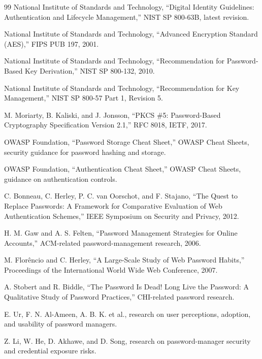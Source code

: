 \documentclass[12pt,a4paper,oneside]{report}
\begin{document}
\clearpage
{}
{}
\renewcommand{\bibname}{References}
\begin{thebibliography}{99}
\small
\setlength{\itemsep}{4pt}
 National Institute of Standards and Technology, “Digital Identity Guidelines: Authentication and Lifecycle Management,” NIST SP 800-63B, latest revision.

 National Institute of Standards and Technology, “Advanced Encryption Standard (AES),” FIPS PUB 197, 2001.

 National Institute of Standards and Technology, “Recommendation for Password-Based Key Derivation,” NIST SP 800-132, 2010.

 National Institute of Standards and Technology, “Recommendation for Key Management,” NIST SP 800-57 Part 1, Revision 5.

 M. Moriarty, B. Kaliski, and J. Jonsson, “PKCS \#5: Password-Based Cryptography Specification Version 2.1,” RFC 8018, IETF, 2017.

 OWASP Foundation, “Password Storage Cheat Sheet,” OWASP Cheat Sheets, security guidance for password hashing and storage.

 OWASP Foundation, “Authentication Cheat Sheet,” OWASP Cheat Sheets, guidance on authentication controls.

 C. Bonneau, C. Herley, P. C. van Oorschot, and F. Stajano, “The Quest to Replace Passwords: A Framework for Comparative Evaluation of Web Authentication Schemes,” IEEE Symposium on Security and Privacy, 2012.

 H. M. Gaw and A. S. Felten, “Password Management Strategies for Online Accounts,” ACM-related password-management research, 2006.

 M. Florêncio and C. Herley, “A Large-Scale Study of Web Password Habits,” Proceedings of the International World Wide Web Conference, 2007.

 A. Stobert and R. Biddle, “The Password Is Dead! Long Live the Password: A Qualitative Study of Password Practices,” CHI-related password research.

 E. Ur, F. N. Al-Ameen, A. B. K. et al., research on user perceptions, adoption, and usability of password managers.

 Z. Li, W. He, D. Akhawe, and D. Song, research on password-manager security and credential exposure risks.


\end{thebibliography}
\end{document}
